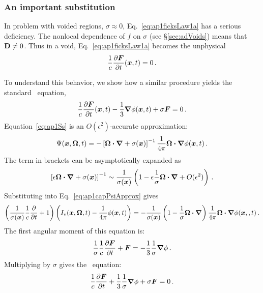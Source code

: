 \subsubsection{An important substitution}
In problem with voided regions, $\sigma\approx 0$, Eq.~\eqref{eq:ap1ficksLaw1a}
has a serious deficiency. The nonlocal dependence of $f$ on $\sigma$ (see
\S\ref{sec:adVoids}) means that $\mathbf{D} \ne 0$. Thus in a void,
Eq.~\eqref{eq:ap1ficksLaw1a} becomes the unphysical
\begin{equation*}
  \frac{1}{c}\frac{\partial \bm{F}}{\partial t}(\bm{x},t) = 0\,.
\end{equation*}

To understand this behavior, we show how a similar procedure yields the standard
\Pone\ equation,
\begin{equation*}
  \frac{1}{c}\frac{\partial \bm{F}}{\partial t}(\bm{x},t) - \frac{1}{3}\bm{\nabla} \phi(\bm{x},t)
  + \sigma \bm{F} = 0\,.
\end{equation*}
Equation~\eqref{eq:ap1Ss} is an $O(\epsilon^2)$-accurate approximation:
\begin{equation*}
  \Psi(\bm{x},\bm{\Omega},t)
  = - \left[ \bm{\Omega}\bm{\cdot} \bm{\nabla} + \sigma(\bm{x}) \right]^{-1} \frac{1}{4\pi} \bm{\Omega}\bm{\cdot} \bm{\nabla} \phi (\bm{x},t)\,.
\end{equation*}
The term in brackets can be asymptotically expanded as
\begin{equation*}
  \left[ \epsilon \bm{\Omega}\bm{\cdot} \bm{\nabla} + \sigma(\bm{x}) \right]^{-1}
  \sim \frac{1}{\sigma(\bm{x})} \left( 1
  - \epsilon \frac{1}{\sigma} \bm{\Omega}\bm{\cdot} \bm{\nabla} + O(\epsilon^2) \right)\,.
\end{equation*}
Substituting into Eq.~\eqref{eq:ap1capPsiApprox} gives
\begin{equation*}
  \left( \frac{1}{\sigma(\bm{x})} \frac{1}{c}\frac{\partial }{\partial t} + 1 \right)
  \left( I_\mathrm{v}(\bm{x},\bm{\Omega},t) - \frac{1}{4\pi} \phi(\bm{x},t) \right)
  = - \frac{1}{\sigma(\bm{x})} \left( 1 - \frac{1}{\sigma} \bm{\Omega}\bm{\cdot}
  \bm{\nabla} \right) \frac{1}{4\pi} \bm{\Omega}\bm{\cdot} \bm{\nabla} \phi
  (\bm{x},,t) \,.
\end{equation*}
The first angular moment of this equation is:
\begin{equation*}
  \frac{1}{\sigma} \frac{1}{c}\frac{\partial \bm{F}}{\partial t} 
  + \bm{F}
  = - \frac{1}{3}\frac{1}{\sigma} \bm{\nabla} \phi \,.
\end{equation*}
Multiplying by $\sigma$ gives the \Pone\ equation:
\begin{equation*}
  \frac{1}{c}\frac{\partial \bm{F}}{\partial t} + \frac{1}{3}\frac{1}{\sigma} \bm{\nabla} \phi
  + \sigma\bm{F}
  = 0 \,.
\end{equation*}

